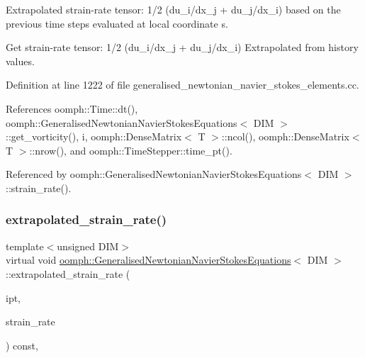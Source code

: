 Extrapolated strain-\/rate tensor\+: 1/2 (du\+\_\+i/dx\+\_\+j + du\+\_\+j/dx\+\_\+i) based on the previous time steps evaluated at local coordinate s. 

Get strain-\/rate tensor\+: 1/2 (du\+\_\+i/dx\+\_\+j + du\+\_\+j/dx\+\_\+i) Extrapolated from history values. 

Definition at line 1222 of file generalised\+\_\+newtonian\+\_\+navier\+\_\+stokes\+\_\+elements.\+cc.



References oomph\+::\+Time\+::dt(), oomph\+::\+Generalised\+Newtonian\+Navier\+Stokes\+Equations$<$ D\+I\+M $>$\+::get\+\_\+vorticity(), i, oomph\+::\+Dense\+Matrix$<$ T $>$\+::ncol(), oomph\+::\+Dense\+Matrix$<$ T $>$\+::nrow(), and oomph\+::\+Time\+Stepper\+::time\+\_\+pt().



Referenced by oomph\+::\+Generalised\+Newtonian\+Navier\+Stokes\+Equations$<$ D\+I\+M $>$\+::strain\+\_\+rate().

\mbox{\label{classoomph_1_1GeneralisedNewtonianNavierStokesEquations_a187db87e3f45c39225b2b0ad657694ae}} 
\subsubsection{\texorpdfstring{extrapolated\+\_\+strain\+\_\+rate()}{extrapolated\_strain\_rate()}\hspace{0.1cm}{\footnotesize\ttfamily [2/2]}}
{\footnotesize\ttfamily template$<$unsigned D\+IM$>$ \\
virtual void \hyperlink{classoomph_1_1GeneralisedNewtonianNavierStokesEquations}{oomph\+::\+Generalised\+Newtonian\+Navier\+Stokes\+Equations}$<$ D\+IM $>$\+::extrapolated\+\_\+strain\+\_\+rate (\begin{DoxyParamCaption}\item[{const unsigned \&}]{ipt,  }\item[{\hyperlink{classoomph_1_1DenseMatrix}{Dense\+Matrix}$<$ double $>$ \&}]{strain\+\_\+rate }\end{DoxyParamCaption}) const\hspace{0.3cm}{\ttfamily [inline]}, {\ttfamily [virtual]}}



